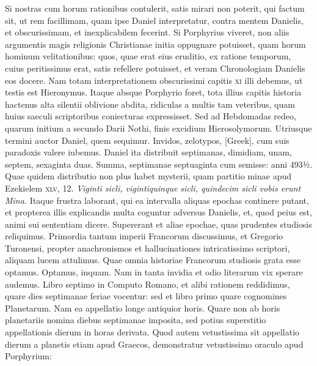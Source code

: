 Si nostras cum horum
rationibus contulerit, satis mirari non poterit, qui factum
sit, ut rem facillimam, quam ipse Daniel interpretatur, contra mentem
Danielis, et obscurissimam, et inexplicabilem fecerint.
Si Porphyrius
viveret, non aliis argumentis magis religionis Christianae
initia oppugnare potuisset, quam horum hominum velitationibus:
quos, quae erat eius eruditio, ex ratione temporum, cuius peritissimus
erat, satis refellere potuisset, et veram Chronologiam
Danielis eos docere.
Nam totam interpretationem obscurissimi
capitis \textsc{xi} illi debemus, ut testis est Hieronymus.
Itaque
absque Porphyrio foret, tota illius capitis historia hactenus alta
silentii oblivione abdita, ridiculas a multis tam veteribus, quam huius
saeculi scriptoribus coniecturas expressisset.
Sed ad Hebdomadas
redeo, quarum initium a secundo Darii Nothi, finis excidium
Hierosolymorum.
Utriusque termini auctor Daniel, quem sequimur.
Invidos, zelotypos, \textgreek{[Greek]}, cum suis
 paradoxis valere iubemus.
Daniel ita distribuit septimanas, dimidiam, unam, septem,
sexaginta duas.
Summa, septimanae septuaginta cum semisse: anni
493½.
Quae quidem distributio non plus habet mysterii, quam
partitio minae apud Ezekielem \textsc{xlv}, 12.
\textit{Viginti sicli, vigintiquinque
sicli, quindecim sicli vobis erunt Mina.}
Itaque frustra laborant,
qui ea intervalla aliquas epochas continere putant, et propterea
illis explicandis multa coguntur adversus Danielis, et, quod peius
est, animi sui sententiam dicere.
Supererant et aliae epochae, quas
prudentes studiosis reliquimus.
Primordia tantum imperii Francorum
discussimus, et Gregorio Turonensi, propter anachronismos
et hallucinationes intricatissimo scriptori, aliquam lucem attulimus.
Quae omnia historiae Francorum studiosis grata esse optamus.
Optamus, inquam.
Nam in tanta invidia et odio literarum
vix sperare audemus.
Libro septimo in Computo Romano, et alibi
rationem reddidimus, quare dies septimanae feriae vocentur: sed
et libro primo quare cognomines Planetarum.
Nam ea appellatio longe antiquior horis.
Quare non ab horis planetariis nomina diebus
septimanae imposita, sed potius superstitio appellationis dierum
in horas derivata.
Quod autem vetustissima sit appellatio dierum
a planetis etiam apud Graecos, demonstratur vetustissimo oraculo
apud Porphyrium:
